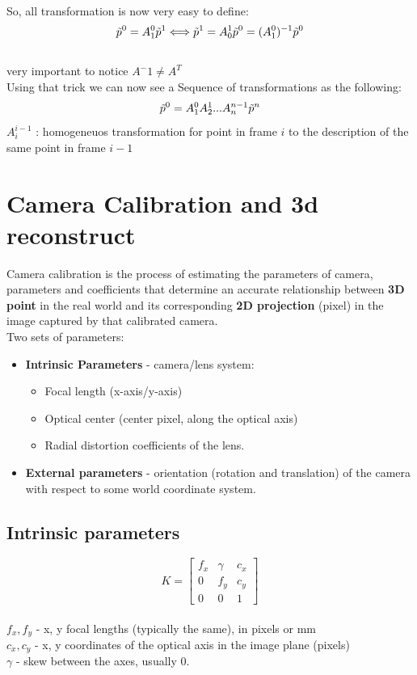 \documentclass{article}
\begin{document}
    \\ So, all transformation is now very easy to define:
    \begin{gather*}
        \Tilde{p}^0 = A^0_1\Tilde{p}^1 \Longleftrightarrow \Tilde{p}^1 = A^1_0\Tilde{p}^0 = (A^0_1)^{-1}\Tilde{p}^0
    \end{gather*}
    \\very important to notice $A^-1\ne A^T$
    \\Using that trick we can now see a Sequence of transformations as the following:
    \begin{gather}
        \Tilde{p}^0 = A^0_1A^1_2...A^{n-1}_n\Tilde{p}^n
    \end{gather}
    $A^{i-1}_i$ : homogeneuos transformation for point in frame $i$ to the description of the same point in frame $i-1$

\section{Camera Calibration and 3d reconstruct}
Camera calibration is the process of estimating the parameters of camera, parameters and coefficients that determine an accurate relationship between \textbf{3D point} in the real world and its corresponding \textbf{2D projection} (pixel) in the image captured by that calibrated camera.\\
Two sets of parameters:
\begin{itemize}
    \item \textbf{Intrinsic Parameters} - camera/lens system:
    \begin{itemize}
        \item Focal length (x-axis/y-axis)
        \item Optical center (center pixel, along the optical axis)
        \item Radial distortion coefficients of the lens.
    \end{itemize}
    \item \textbf{External parameters} - orientation (rotation and translation) of the camera with respect to some world coordinate system.
\end{itemize}
\subsection{Intrinsic parameters}
$$K = \begin{bmatrix}
f_x & \gamma & c_x \\
0 & f_y & c_y \\
0 & 0 & 1
\end{bmatrix} $$\\
$f_x, f_y$ - x, y focal lengths (typically the same), in pixels or mm \\
$c_x, c_y$ - x, y coordinates of the optical axis in the image plane (pixels) \\
$\gamma$ - skew between the axes, usually 0.
\end{document}
